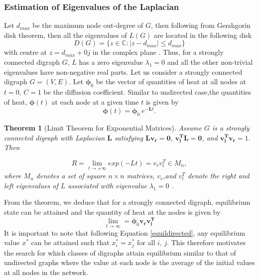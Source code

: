 \documentclass[10pt,a4paper]{article}
\newtheorem{thm}{Theorem}
\begin{document}
        \subsubsection{Estimation of Eigenvalues of the Laplacian}
        Let $d_{max}$ be the maximum node out-degree of $G$, then following from Gershgorin disk theorem, then all the eigenvalues of $L(G)$ are located in the following disk
        \begin{equation} 
        D(G) = \{ z \in \mathbb{C} : |z-d_{max}| \leq d_{max} \}
        \end{equation}
        with centre at $z = d_{max} +0j$ in the complex plane \citep{saber2003agreement}. Thus, for a strongly connected digraph $G$, $L$ has a zero eigenvalue $\lambda_1=0$ and all the other non-trivial eigenvalues have non-negative real parts.
        Let us consider a strongly connected digraph $G=(V,E)$. Let $\boldsymbol{\phi}_0$ be the vector of quantities of heat at all nodes at $t=0$, $C=1$ be the diffusion coefficient. Similar to undirected case,the quantities of heat, $\boldsymbol{\phi}(t)$ at each node at a given time $t$ is given by
        \begin{equation}
        \boldsymbol{\phi}(t) = \boldsymbol{\phi}_0~e^{-\mathbf{L}t}.
        \end{equation}
        
        \begin{thm}[Limit Theorem for Exponential Matrices]
        	Assume $G$ is a strongly connected digraph with Laplacian $\mathbf{L}$ satisfying $\mathbf{L} \mathbf{v_r} = \mathbf{0}$, $\mathbf{v_{l} ^T} \mathbf{L} =\mathbf{0}$, and $\mathbf{v_{l} ^T} \mathbf{v_r}=1$. Then 
        	
        	\begin{equation}
        	 R = \lim_{t \longrightarrow +\infty} exp(-Lt) = v_r  v_{l} ^T \in M_n,
        	\end{equation}
        	where $M_n$ denotes a set of square $n\times n$ matrices, $v_r$,and $v_{l} ^T$ denote the right and left eigenvalues of $L$ associated with eigenvalue $\lambda_1 = 0$ \citep{saber2003agreement}.
        	\label{exponentialTheorem}
        \end{thm}
    From the theorem, we deduce that for a strongly connected digraph, equilibrium state can be attained and the quantity of heat at the nodes is given by
    \begin{equation}
    \lim_{t \longrightarrow \infty} =  \boldsymbol{\phi}_0  \mathbf{v_r}  \mathbf{v_{l} ^T}
    \label{equildirected}
    \end{equation}
    It is important to note that following Equation \ref{equildirected}, any equilibrium value $x^*$ can be attained such that $x^*_i =x^*_j$ for all $i$, $j$. This therefore motivates the search for which classes of digraphs attain equilibrium similar to that of undirected graphs where the value at each node is the average of the initial values at all nodes in the network.
    
\end{document}
